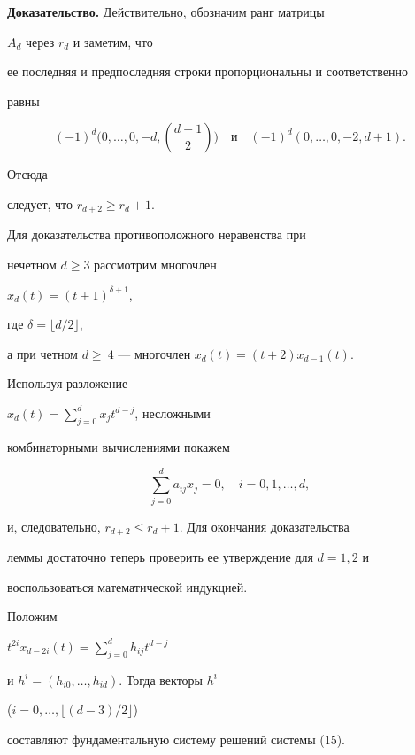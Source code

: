 {\bf Доказательство.} Действительно, обозначим ранг матрицы


$A_d$ через $r_d$ и заметим, что


ее последняя и предпоследняя строки пропорциональны и соответственно


равны


$$(-1)^d\Biggl(0,\dotsc,0,-d,\binom{d+1}{2}\Biggr)\quad


\text{и}


\quad(-1)^d(0,\dotsc,0,-2,d+1).


$$


Отсюда


следует, что $r_{d+2}\ge r_d+1$. 


Для доказательства противоположного неравенства при


нечетном $d\ge 3$ рассмотрим многочлен


$x_d(t)=(t+1)^{\delta+1}$,


где $\delta=\lfloor d/2\rfloor$,


а при четном {$d\ge~4$} --- многочлен $x_d(t)=(t+2)x_{d-1}(t)$.


Используя разложение


$x_d(t)=\sum\limits^d_{j=0}x_jt^{d-j}$, несложными


комбинаторными вычислениями покажем


\begin{equation}


\sum^d_{j=0}a_{ij}x_j=0,\quad i=0,1,\dotsc,d,


\end{equation}


и, следовательно, $r_{d+2}\le r_d+1$. Для окончания доказательства


леммы достаточно теперь проверить ее утверждение для $d=1,2$ и


воспользоваться математической индукцией.





\begin{cor}


Положим


$t^{2i}x_{d-2i}(t)=\sum\limits^d_{j=0}h_{ij}t^{d-j}$


и $h^i=(h_{i0},\dotsc,h_{id})$. Тогда векторы $h^i$


($i=0,\dotsc,\lfloor(d-3)/2\rfloor$)


составляют фундаментальную систему решений системы (15).


\end{cor}





